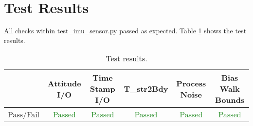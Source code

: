 \documentclass[]{BasiliskReportMemo}
\begin{document}
\section{Test Results}

All checks within test\_imu\_sensor.py passed as expected. Table \ref{tab:results} shows the test results.

\begin{table}[htbp]
	\caption{Test results.}
	\label{tab:results}
	\centering \fontsize{10}{10}\selectfont
	\begin{tabular}{c | c | c | c | c | c } %
		\hline
		   & Attitude I/O & Time Stamp I/O & T\_str2Bdy & Process Noise & Bias Walk Bounds \\
		\hline
		Pass/Fail & \textcolor{ForestGreen}{Passed} & \textcolor{ForestGreen}{Passed} &  \textcolor{ForestGreen}{Passed}&  \textcolor{ForestGreen}{Passed} & \textcolor{ForestGreen}{Passed}\\
		\hline
	\end{tabular}
\end{table}
\end{document}
